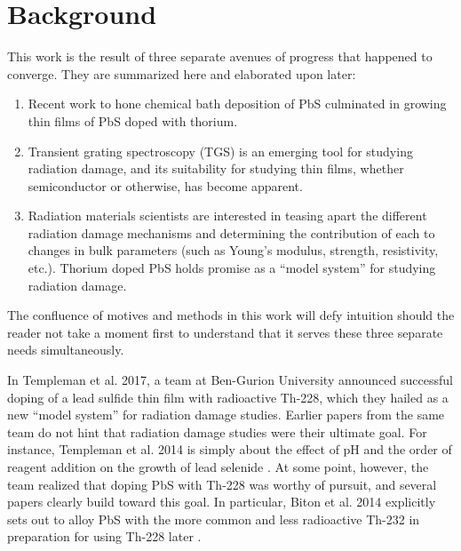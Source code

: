\chapter{Background}
%
This work is the result of three separate avenues of progress that happened to converge. They are summarized here and elaborated upon later:
\begin{enumerate}
	\item Recent work to hone chemical bath deposition of PbS culminated in growing thin films of PbS doped with thorium.\label{first_avenue}
	\item Transient grating spectroscopy (TGS) is an emerging tool for studying radiation damage, and its suitability for studying thin films, whether semiconductor or otherwise, has become apparent.\label{second_avenue}
	\item Radiation materials scientists are interested in teasing apart the different radiation damage mechanisms and determining the contribution of each to changes in bulk parameters (such as Young's modulus, strength, resistivity, etc.). Thorium doped PbS holds promise as a ``model system'' for studying radiation damage.\label{third_avenue}
\end{enumerate}
The confluence of motives and methods in this work will defy intuition should the reader not take a moment first to understand that it serves these three separate needs simultaneously.

In Templeman et al. 2017, a team at Ben-Gurion University announced successful doping of a lead sulfide thin film with radioactive Th-228, which they hailed as a new ``model system'' for radiation damage studies. Earlier papers from the same team do not hint that radiation damage studies were their ultimate goal. For instance, Templeman et al. 2014 is simply about the effect of pH and the order of reagent addition on the growth of lead selenide \cite{Templeman2014}. At some point, however, the team realized that doping PbS with Th-228 was worthy of pursuit, and several papers clearly build toward this goal. In particular, Biton et al. 2014 explicitly sets out to alloy PbS with the more common and less radioactive Th-232 in preparation for using Th-228 later \cite{Biton2014}.

